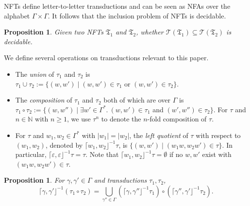 \documentclass[preprint,12pt]{elsarticle}
\newtheorem{proposition}[theorem]{Proposition}
\newcommand\Tran{{\mathfrak{T} }}
\newcommand\TLang{{\mathscr{T} }}
\newcommand\UTrans{{\mathscr{T}_{RLP} }}
\newcommand{\NFA}{\textsf{NFA}}
\newcommand{\NFT}{\textsf{NFT}}
\newcommand{\LTLNFT}{\textsf{L2LNFT}}
\newcommand\Nat{\mathbb{N} }
\begin{document}

{\NFT}s define letter-to-letter transductions and can be seen as {\NFA}s over the alphabet $\Gamma \times \Gamma$. It follows that the inclusion problem of {\NFT}s is decidable.

\begin{proposition}\label{prop-nft-inclusion}
Given two {\NFT}s $\Tran_1$ and $\Tran_2$,  whether $\TLang(\Tran_1) \subseteq \TLang(\Tran_2)$ is decidable.
\end{proposition} 

%
We define several operations on transductions relevant to this paper. 
\begin{itemize}
\item The \emph{union} of $\tau_1$ and $\tau_2$ is $\tau_1 \cup \tau_2:=\{(w, w') \mid (w, w') \in \tau_1 \mbox{ or } (w,w') \in \tau_2\}$.
%
%
\item %
The \emph{composition} of $\tau_1$ and $\tau_2$ both of which are over $\Gamma$ is $\tau_1 \circ \tau_2 := \{(w, w'') \mid \exists w' \in \Gamma^*.\ (w,w') \in \tau_1$ and $(w',w'') \in \tau_2\}$. For $\tau$ and $n \in \Nat$ with $n \ge 1$, we use $\tau^n$ to denote the $n$-fold composition of $\tau$. 
%
\item For  $\tau$ and  $w_1,w_2 \in \Gamma^*$ with $|w_1| = |w_2|$, the \emph{left quotient} of $\tau$ with respect to $(w_1, w_2)$, denoted by $\lceil w_1, w_2 \rfloor^{-1} \tau$, is  $\{(w,w') \mid (w_1w, w_2w') \in \tau\}$. In particular, $\lceil \varepsilon, \varepsilon\rfloor^{-1} \tau =\tau$. Note that  $\lceil w_1, w_2 \rfloor^{-1} \tau = \emptyset$ if no  $w, w'$ exist with $(w_1w, w_2 w') \in \tau$.
%
\end{itemize}

\begin{proposition}
    For   $\gamma,\gamma'\in\Gamma$ and transductions $\tau_1,\tau_2$,
    $$\lceil \gamma,\gamma'\rfloor^{-1}(\tau_1\circ\tau_2) = \bigcup_{\gamma'' \in \Gamma} (\lceil \gamma,\gamma''\rfloor^{-1}\tau_1)\circ(\lceil\gamma'',\gamma'\rfloor^{-1}\tau_2). $$
\end{proposition}
\end{document}
